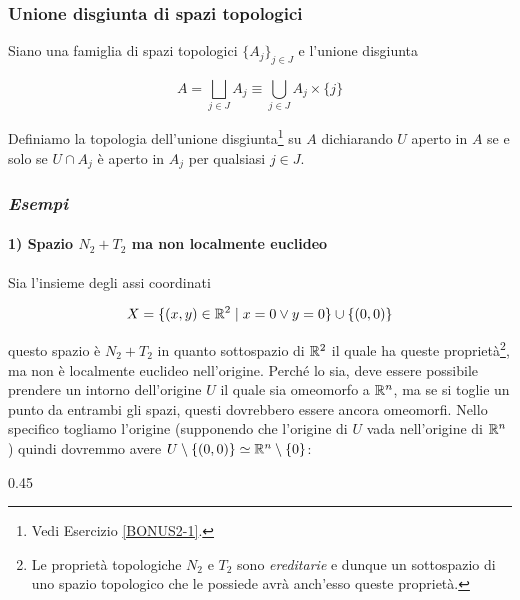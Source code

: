 \subsubsection{Unione disgiunta di spazi topologici}

Siano una famiglia di spazi topologici $ \{A_{j}\}_{j \in J} $ e l'unione disgiunta

\begin{equation}
		A = \bigsqcup_{j \in J} A_{j} \equiv \bigcup_{j \in J} A_{j} \times \{j\}
\end{equation}

Definiamo la topologia dell'unione disgiunta\footnote{%
	Vedi Esercizio \ref{BONUS2-1}.%
} su $ A $ dichiarando $ U $ aperto in $ A $ se e solo se $ U \cap A_{j} $ è aperto in $ A_{j} $ per qualsiasi $ j \in J $.

\subsubsection{\textit{Esempi}}

\paragraph{1) Spazio $ N_{2} + T_{2} $ ma non localmente euclideo} 

Sia l'insieme degli assi coordinati

\begin{equation}
	X = \{ (x,y) \in \mathbb{R}^{2} \mid x = 0 \lor y = 0 \} \cup \{ (0,0) \}
\end{equation}

questo spazio è $ N_{2} + T_{2} $ in quanto sottospazio di $ \mathbb{R}^{2} $ il quale ha queste proprietà\footnote{%
	Le proprietà topologiche $ N_{2} $ e $ T_{2} $ sono \textit{ereditarie} e dunque un sottospazio di uno spazio topologico che le possiede avrà anch'esso queste proprietà.%
}, ma non è localmente euclideo nell'origine. Perché lo sia, deve essere possibile prendere un intorno dell'origine $ U $ il quale sia omeomorfo a $ \mathbb{R}^{n} $, ma se si toglie un punto da entrambi gli spazi, questi dovrebbero essere ancora omeomorfi. Nello specifico togliamo l'origine (supponendo che l'origine di $ U $ vada nell'origine di $ \mathbb{R}^{n} $) quindi dovremmo avere $ U \setminus \{(0,0)\} \simeq \mathbb{R}^{n} \setminus \{0\} $:

	{0.45}{%
		}
	
